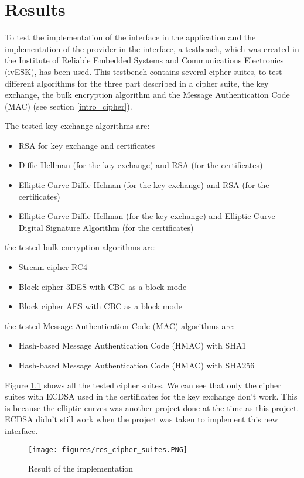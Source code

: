 \chapter{Results}

To test the implementation of the interface in the application \embtls and the
implementation of the provider \tomcrypt in the interface, a testbench, which
was created in the Institute of Reliable Embedded Systems and Communications
Electronics (ivESK), has been used.
This testbench contains several cipher suites, to test different algorithms for
the three part described in a cipher suite, the key exchange, the bulk
encryption algorithm and the Message Authentication Code (MAC) (see section
\ref{intro_cipher}).

The tested key exchange algorithms are:
\begin{itemize}[noitemsep]
  \item RSA for key exchange and certificates
  \item Diffie-Hellman (for the key exchange) and RSA (for the certificates)
  \item Elliptic Curve Diffie-Helman (for the key exchange) and RSA (for the
  certificates)
  \item Elliptic Curve Diffie-Hellman (for the key exchange) and Elliptic Curve
  Digital Signature Algorithm (for the certificates)
\end{itemize}

the tested bulk encryption algorithms are:
\begin{itemize}[noitemsep]
  \item Stream cipher RC4
  \item Block cipher 3DES with CBC as a block mode
  \item Block cipher AES with CBC as a block mode
\end{itemize}

the tested Message Authentication Code (MAC) algorithms are:
\begin{itemize}[noitemsep]
  \item Hash-based Message Authentication Code (HMAC) with SHA1
  \item Hash-based Message Authentication Code (HMAC) with SHA256
\end{itemize}

Figure \ref{fig:res} shows all the tested cipher suites. We can see that only
the cipher suites with ECDSA used in the certificates for the key exchange
don't work. This is because the elliptic curves was another project done at the
time as this project. ECDSA didn't still work when the project was taken to
implement this new interface.

\begin{figure}[!ht]
\centering
\texttt{[image: figures/res\_cipher\_suites.PNG]}
\caption{Result of the implementation}
\label{fig:res}
\end{figure}